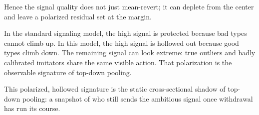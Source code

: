 Hence the signal quality does not just mean-revert; it can deplete from the center and leave a polarized residual set at the margin.

In the standard signaling model, the high signal is protected because bad types cannot climb up. In this model, the high signal is hollowed out because good types climb down. The remaining signal can look extreme: true outliers and badly calibrated imitators share the same visible action. That polarization is the observable signature of top-down pooling.

This polarized, hollowed signature is the static cross-sectional shadow of top-down pooling: a snapshot of who still sends the ambitious signal once withdrawal has run its course.
